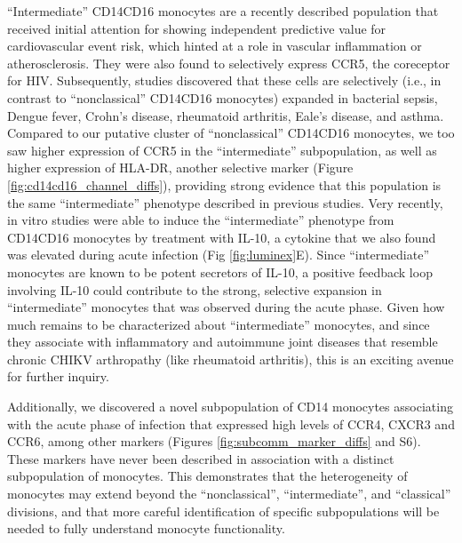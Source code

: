 “Intermediate” CD14\sups{++}\allowbreak CD16\sups{+} monocytes are a recently described population\autocite{Wong2011,Ziegler-Heitbrock2010} that received initial attention for showing independent predictive value for cardiovascular event risk,\autocite{Rogacev2012} which hinted at a role in vascular inflammation or atherosclerosis. They were also found to selectively express CCR5, the coreceptor for HIV.\autocite{Ellery2007} Subsequently, studies discovered that these cells are selectively (i.e., in contrast to “nonclassical” CD14\sups{+}\allowbreak CD16\sups{++} monocytes) expanded in bacterial sepsis, Dengue fever, Crohn’s disease, rheumatoid arthritis, Eale’s disease, and asthma.\autocite{Wong2012} Compared to our putative cluster of “nonclassical” CD14\sups{+}\allowbreak CD16\sups{++} monocytes, we too saw higher expression of CCR5 in the “intermediate” subpopulation, as well as higher expression of HLA-DR, another selective marker (Figure \ref{fig:cd14cd16_channel_diffs}), providing strong evidence that this population is the same “intermediate” phenotype described in previous studies.\autocite{Zawada2011} Very recently, in vitro studies were able to induce the “intermediate” phenotype from CD14\sups{+}\allowbreak CD16 monocytes by treatment with IL-10,\autocite{Tsukamoto2017} a cytokine that we also found was elevated during acute infection (Fig \ref{fig:luminex}E). Since “intermediate” monocytes are known to be potent secretors of IL-10,\autocite{Skrzeczynska-Moncznik2008} a positive feedback loop involving IL-10 could contribute to the strong, selective expansion in “intermediate” monocytes that was observed during the acute phase. Given how much remains to be characterized about “intermediate” monocytes, and since they associate with inflammatory and autoimmune joint diseases that resemble chronic CHIKV arthropathy (like rheumatoid arthritis), this is an exciting avenue for further inquiry.\autocite{Chaaitanya2011,Miner2015,Nakaya2012}

Additionally, we discovered a novel subpopulation of CD14\sups{+} monocytes associating with the acute phase of infection that expressed high levels of CCR4, CXCR3 and CCR6, among other markers (Figures \ref{fig:subcomm_marker_diffs} and S6). These markers have never been described in association with a distinct subpopulation of monocytes. This demonstrates that the heterogeneity of monocytes may extend beyond the “nonclassical”, “intermediate”, and “classical” divisions,\autocite{Appleby2013} and that more careful identification of specific subpopulations will be needed to fully understand monocyte functionality.\autocite{Stansfield2015}

